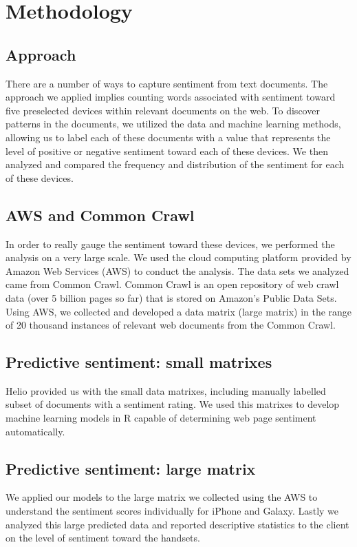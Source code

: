 \documentclass[12]{article}
\begin{document}
\section{Methodology}
\subsection{Approach}
There are a number of ways to capture sentiment from text documents. The approach we applied implies counting words associated with sentiment toward five preselected devices within relevant documents on the web. To discover patterns in the documents, we utilized the data and machine learning methods, allowing us to label each of these documents with a value that represents the level of positive or negative sentiment toward each of these devices. We then analyzed and compared the frequency and distribution of the sentiment for each of these devices.
\subsection{AWS and Common Crawl}
In order to really gauge the sentiment toward these devices, we performed the analysis on a very large scale. We used the cloud computing platform provided by Amazon Web Services (AWS) to conduct the analysis. The data sets we analyzed came from Common Crawl. Common Crawl is an open repository of web crawl data (over 5 billion pages so far) that is stored on Amazon’s Public Data Sets. Using AWS, we collected and developed a data matrix (large matrix) in the range of 20 thousand instances of relevant web documents from the Common Crawl.
\subsection{Predictive sentiment: small matrixes}
Helio provided us with the small data matrixes, including manually labelled subset of documents with a sentiment rating. We used this matrixes to develop machine learning models in R capable of determining web page sentiment automatically. 
\subsection{Predictive sentiment: large matrix}
We applied our models to the large matrix we collected using the AWS to understand the sentiment scores individually for iPhone and Galaxy. Lastly we analyzed this large predicted data and reported descriptive statistics to the client on the level of sentiment toward the handsets.
\end{document}
